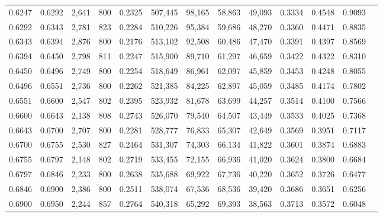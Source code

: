\begin{tabular}{rrrrrrrrrrrrr}
0.6247 & 0.6292 &  2,641 &   800 &                                     0.2325 & 507,445 &  98,165 &  58,863 &  49,093 & 0.3334 & 0.4548 & 0.9093 \\
0.6292 & 0.6343 &  2,781 &   823 &                                     0.2284 & 510,226 &  95,384 &  59,686 &  48,270 & 0.3360 & 0.4471 & 0.8835 \\
0.6343 & 0.6394 &  2,876 &   800 &                                     0.2176 & 513,102 &  92,508 &  60,486 &  47,470 & 0.3391 & 0.4397 & 0.8569 \\
0.6394 & 0.6450 &  2,798 &   811 &                                     0.2247 & 515,900 &  89,710 &  61,297 &  46,659 & 0.3422 & 0.4322 & 0.8310 \\
0.6450 & 0.6496 &  2,749 &   800 &                                     0.2254 & 518,649 &  86,961 &  62,097 &  45,859 & 0.3453 & 0.4248 & 0.8055 \\
0.6496 & 0.6551 &  2,736 &   800 &                                     0.2262 & 521,385 &  84,225 &  62,897 &  45,059 & 0.3485 & 0.4174 & 0.7802 \\
0.6551 & 0.6600 &  2,547 &   802 &                                     0.2395 & 523,932 &  81,678 &  63,699 &  44,257 & 0.3514 & 0.4100 & 0.7566 \\
0.6600 & 0.6643 &  2,138 &   808 &                                     0.2743 & 526,070 &  79,540 &  64,507 &  43,449 & 0.3533 & 0.4025 & 0.7368 \\
0.6643 & 0.6700 &  2,707 &   800 &                                     0.2281 & 528,777 &  76,833 &  65,307 &  42,649 & 0.3569 & 0.3951 & 0.7117 \\
0.6700 & 0.6755 &  2,530 &   827 &                                     0.2464 & 531,307 &  74,303 &  66,134 &  41,822 & 0.3601 & 0.3874 & 0.6883 \\
0.6755 & 0.6797 &  2,148 &   802 &                                     0.2719 & 533,455 &  72,155 &  66,936 &  41,020 & 0.3624 & 0.3800 & 0.6684 \\
0.6797 & 0.6846 &  2,233 &   800 &                                     0.2638 & 535,688 &  69,922 &  67,736 &  40,220 & 0.3652 & 0.3726 & 0.6477 \\
0.6846 & 0.6900 &  2,386 &   800 &                                     0.2511 & 538,074 &  67,536 &  68,536 &  39,420 & 0.3686 & 0.3651 & 0.6256 \\
0.6900 & 0.6950 &  2,244 &   857 &                                     0.2764 & 540,318 &  65,292 &  69,393 &  38,563 & 0.3713 & 0.3572 & 0.6048 \\

\end{tabular}
